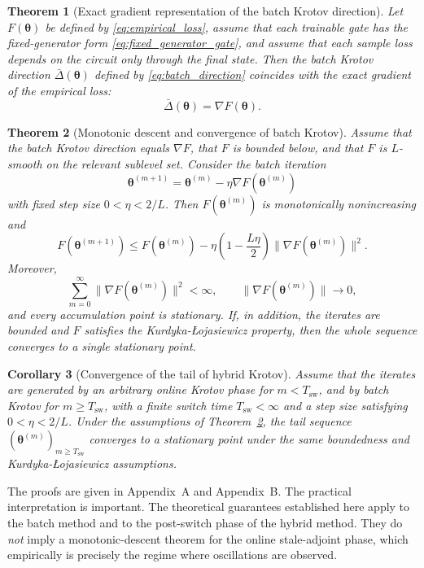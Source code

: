 \documentclass[aps,prb,10pt,twocolumn,superscriptaddress]{revtex4-2}
\newtheorem{theorem}{Theorem}
\newtheorem{corollary}[theorem]{Corollary}
\begin{document}
\begin{theorem}[Exact gradient representation of the batch Krotov direction]
\label{thm:exact_gradient_krotov_main}
Let \(F(\bm{\theta})\) be defined by \eqref{eq:empirical_loss}, assume that each trainable gate has the fixed-generator form \eqref{eq:fixed_generator_gate}, and assume that each sample loss depends on the circuit only through the final state. Then the batch Krotov direction \(\bar{\Delta}(\bm{\theta})\) defined by \eqref{eq:batch_direction} coincides with the exact gradient of the empirical loss:
\[
\bar{\Delta}(\bm{\theta})=\nabla F(\bm{\theta}).
\]
\end{theorem}

\begin{theorem}[Monotonic descent and convergence of batch Krotov]
\label{thm:batch_krotov_convergence_main}
Assume that the batch Krotov direction equals \(\nabla F\), that \(F\) is bounded below, and that \(F\) is \(L\)-smooth on the relevant sublevel set. Consider the batch iteration
\[
\bm{\theta}^{(m+1)}=\bm{\theta}^{(m)}-\eta \nabla F(\bm{\theta}^{(m)})
\]
with fixed step size \(0<\eta<2/L\). Then \(F(\bm{\theta}^{(m)})\) is monotonically nonincreasing and
\[
F(\bm{\theta}^{(m+1)})
\leq
F(\bm{\theta}^{(m)})
-\eta\left(1-\frac{L\eta}{2}\right)\|\nabla F(\bm{\theta}^{(m)})\|^2.
\]
Moreover,
\[
\sum_{m=0}^{\infty}\|\nabla F(\bm{\theta}^{(m)})\|^2<\infty,
\qquad
\|\nabla F(\bm{\theta}^{(m)})\|\to 0,
\]
and every accumulation point is stationary. If, in addition, the iterates are bounded and \(F\) satisfies the Kurdyka-\L{}ojasiewicz property, then the whole sequence converges to a single stationary point.
\end{theorem}

\begin{corollary}[Convergence of the tail of hybrid Krotov]
\label{cor:hybrid_tail_main}
Assume that the iterates are generated by an arbitrary online Krotov phase for \(m<T_{\mathrm{sw}}\), and by batch Krotov for \(m\geq T_{\mathrm{sw}}\), with a finite switch time \(T_{\mathrm{sw}}<\infty\) and a step size satisfying \(0<\eta<2/L\). Under the assumptions of Theorem~\ref{thm:batch_krotov_convergence_main}, the tail sequence \((\bm{\theta}^{(m)})_{m\geq T_{\mathrm{sw}}}\) converges to a stationary point under the same boundedness and Kurdyka-\L{}ojasiewicz assumptions.
\end{corollary}

The proofs are given in Appendix~A and Appendix~B. The practical interpretation is important. The theoretical guarantees established here apply to the batch method and to the post-switch phase of the hybrid method. They do \emph{not} imply a monotonic-descent theorem for the online stale-adjoint phase, which empirically is precisely the regime where oscillations are observed.
\end{document}
